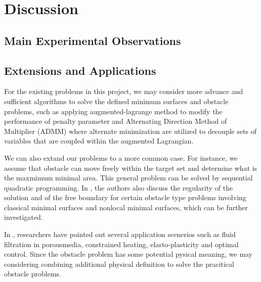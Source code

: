 \section{Discussion}
\subsection{Main Experimental Observations}
\subsection{Extensions and Applications}
For the existing problems in this project, we may consider more advance and sufficient algorithms to solve the defined minimum surfaces and obstacle problems, such as applying augmented-lagrange method to modify the performance of penalty parameter and Alternating Direction Method of Multiplier (ADMM) where alternate minimization are utilized to decouple sets of variables that are coupled within the augmented Lagrangian.

We can also extand our problems to a more common case. For instance, we assume that obstacle can move freely within the target set and determine what is the maxmimum minimal area. This general problem can be solved by 
sequential quadratic programming. In \cite{caffarelli2016obstacle}, the authors also discuss the regularity of the solution and of the free boundary for certain obstacle type problems involving classical minimal surfaces and nonlocal minimal surfaces, which can be further investigated.

In \cite{attouch2014variational}, researchers have pointed out several application scenerios such as fluid filtration in porousmedia, constrained heating, elasto-plasticity and optimal control. Since the obstacle problem has some potential pysical meaning, we may considering combining additional physical definition to solve the pracitical obstacle problems.